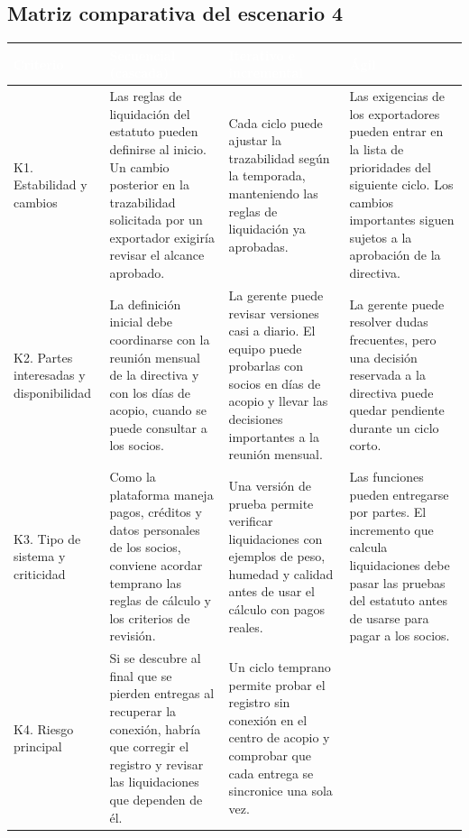\subsection{Matriz comparativa del escenario 4}

\begin{center}
\small
\begin{tabularx}{\textwidth}{|>{\raggedright\arraybackslash}p{2.6cm}|L|L|L|}
\hline
{}
\textcolor{white}{\textbf{Criterio}}
& \textcolor{white}{\textbf{Secuencial (cascada)}}
& \textcolor{white}{\textbf{Iterativo e incremental}}
& \textcolor{white}{\textbf{Ágil}} \\ \hline
K1. Estabilidad y cambios
& Las reglas de liquidación del estatuto pueden definirse al inicio. Un cambio posterior en la trazabilidad solicitada por un exportador exigiría revisar el alcance aprobado.
& Cada ciclo puede ajustar la trazabilidad según la temporada, manteniendo las reglas de liquidación ya aprobadas.
& Las exigencias de los exportadores pueden entrar en la lista de prioridades del siguiente ciclo. Los cambios importantes siguen sujetos a la aprobación de la directiva.
\\ \hline
K2. Partes interesadas y disponibilidad
& La definición inicial debe coordinarse con la reunión mensual de la directiva y con los días de acopio, cuando se puede consultar a los socios.
& La gerente puede revisar versiones casi a diario. El equipo puede probarlas con socios en días de acopio y llevar las decisiones importantes a la reunión mensual.
& La gerente puede resolver dudas frecuentes, pero una decisión reservada a la directiva puede quedar pendiente durante un ciclo corto.
\\ \hline
K3. Tipo de sistema y criticidad
& Como la plataforma maneja pagos, créditos y datos personales de los socios, conviene acordar temprano las reglas de cálculo y los criterios de revisión.
& Una versión de prueba permite verificar liquidaciones con ejemplos de peso, humedad y calidad antes de usar el cálculo con pagos reales.
& Las funciones pueden entregarse por partes. El incremento que calcula liquidaciones debe pasar las pruebas del estatuto antes de usarse para pagar a los socios.
\\ \hline
K4. Riesgo principal
& Si se descubre al final que se pierden entregas al recuperar la conexión, habría que corregir el registro y revisar las liquidaciones que dependen de él.
& Un ciclo temprano permite probar el registro sin conexión en el centro de acopio y comprobar que cada entrega se sincronice una sola vez.

\end{tabularx}
\end{center}
